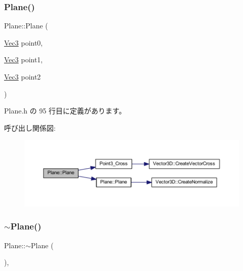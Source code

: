 \subsubsection{\texorpdfstring{Plane()}{Plane()}\hspace{0.1cm}{\footnotesize\ttfamily [2/2]}}
{\footnotesize\ttfamily Plane\+::\+Plane (\begin{DoxyParamCaption}\item[{\mbox{\hyperlink{_vector3_d_8h_ab16f59e4393f29a01ec8b9bbbabbe65d}{Vec3}}}]{point0,  }\item[{\mbox{\hyperlink{_vector3_d_8h_ab16f59e4393f29a01ec8b9bbbabbe65d}{Vec3}}}]{point1,  }\item[{\mbox{\hyperlink{_vector3_d_8h_ab16f59e4393f29a01ec8b9bbbabbe65d}{Vec3}}}]{point2 }\end{DoxyParamCaption})\hspace{0.3cm}{\ttfamily [inline]}}



 Plane.\+h の 95 行目に定義があります。

呼び出し関係図\+:\nopagebreak
\begin{figure}[H]
\begin{center}
\leavevmode
\includegraphics[width=350pt]{class_plane_a9554deff9f83d09a772c15bca3d468d5_cgraph}
\end{center}
\end{figure}
\mbox{\label{class_plane_a69abd86051c880dcb44b249ad10c4436}} 
\subsubsection{\texorpdfstring{$\sim$\+Plane()}{~Plane()}}
{\footnotesize\ttfamily Plane\+::$\sim$\+Plane (\begin{DoxyParamCaption}{ }\end{DoxyParamCaption})\hspace{0.3cm}{\ttfamily [inline]}, {\ttfamily [virtual]}}



